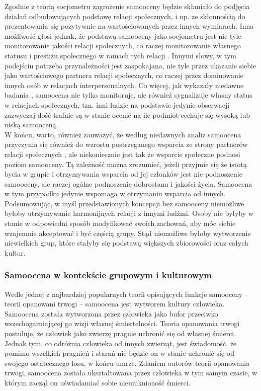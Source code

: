 \documentclass[man]{apa6}
\begin{document}
Zgodnie z teorią socjometru zagrożenie samooceny będzie skłaniało do podjęcia działań odbudowujących podstawę relacji społecznych, i np. ze skłonnością do prezentowania się pozytywnie na wartościowanych przez innych wymiarach. Inna możliwość głosi jednak, że podstawą samooceny jako socjometru jest nie tyle monitorowanie jakości relacji społecznych, co raczej monitorowanie własnego statusu i prestiżu społecznego w ramach tych relacji \parencite{barkow1980prestige}. Innymi słowy, w tym podejściu potrzeba przynależności jest zaspokajana, nie tyle przez ukazanie siebie jako wartościowego partnera relacji społecznych, co raczej przez dominowanie innych osób w relacjach interpersonalnych. Co więcej, jak wykazały niedawne badania \parencite{zeigler2013status}, samoocena nie tylko monitoruje, ale również sygnalizuje własny status w relacjach społecznych, tzn. inni ludzie na podstawie jedynie obserwacji zazwyczaj dość trafnie są w stanie ocenić na ile podmiot cechuje się wysoką lub niską samooceną.\\

W końcu, warto, również zauważyć, że według niedawnych analiz samoocena przyczynia się również do wzrostu postrzeganego wsparcia ze strony partnerów relacji społecznych \parencite{marshall2014self}, ale niekoniecznie jest tak że wsparcie społeczne podnosi poziom samooceny. Tą zależność można zrozumieć, jeżeli przyjmie się że istotą bycia w grupie i otrzymywania wsparcia od jej członków jest nie podnoszenie samooceny, ale raczej ogólne podnoszenie dobrostanu i jakości życia. Samoocena w tym przypadku jedynie wspomaga w otrzymaniu wsparcia od innych.\\

Podsumowując, w myśl przedstawionych koncepcji bez samooceny niemożliwe byłoby utrzymywanie harmonijnych relacji z innymi ludźmi. Osoby nie byłyby w stanie w odpowiedni sposób modyfikować swoich zachowań, aby móc siebie wzajemnie akceptować i być częścią grupy. Stąd niemożliwe byłoby wytworzenie niewielkich grup, które stałyby się podstawą większych zbiorowości oraz całych kultur.

\subsubsection{Samoocena w kontekście grupowym i kulturowym}

Wedle jednej z najbardziej popularnych teorii opisujących funkcje samooceny -- teorii opanowani trwogi \parencite{pyszczynski2004people} -- samoocena jest wytworem kultury człowieka. Samoocena została wytworzona przez człowieka jako bufor przeciwko wszechogarniającej go wizji własnej śmiertelności. Teoria opanowania trwogi postuluje, że człowiek jako zwierzę pragnie uchronić się od własnej śmierci. Jednak tym, co odróżnia człowieka od innych zwierząt, jest świadomość, że pomimo wszelkich pragnień i starań nie będzie on w stanie uchronić się od swojego ostatecznego losu, w końcu umrze. Zdaniem autorów teorii opanowania trwogi, samoocena została ukształtowana przez człowieka w tym samym czasie, w którym zaczął on uświadamiać sobie nieuniknioność śmierci.\\
\end{document}
